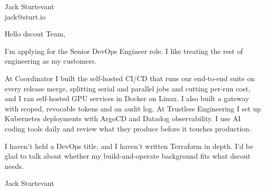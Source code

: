 \documentclass[11pt]{article}
\begin{document}
\raggedright

{\namefont\fontsize{20pt}{24pt}\selectfont Jack Sturtevant}\\[-0.3em]
jack@sturt.io

\vspace{1.2em}

Hello dscout Team,

I'm applying for the Senior DevOps Engineer role. I like treating the rest of engineering as my customers.

At Coordinator I built the self-hosted CI/CD that runs our end-to-end suite on every release merge, splitting serial and parallel jobs and cutting per-run cost, and I ran self-hosted GPU services in Docker on Linux. I also built a gateway with scoped, revocable tokens and an audit log. At Trustless Engineering I set up Kubernetes deployments with ArgoCD and Datadog observability. I use AI coding tools daily and review what they produce before it touches production.

I haven't held a DevOps title, and I haven't written Terraform in depth. I'd be glad to talk about whether my build-and-operate background fits what dscout needs.

\vspace{0.6em}
Jack Sturtevant
\end{document}

